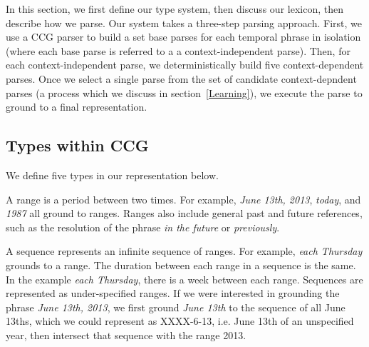 In this section, we first define our type system, then discuss our lexicon, then describe how we parse. Our system takes a three-step parsing approach. First, we use a CCG parser to build a set base parses for each temporal phrase in isolation (where each base parse is referred to a a context-independent parse). Then, for each context-independent parse, we deterministically build five context-dependent parses. Once we select a single parse from the set of candidate context-depndent parses (a process which we discuss in section~\ref{Learning}), we execute the parse to ground to a final representation.

\subsection{Types within CCG}
\label{sec:CCGtypes}
We define five types in our representation below.

\begin{definition}[Range]
A range is a period between two times. For example, \emph{June 13th, 2013}, \emph{today}, and \emph{1987} all ground to ranges. Ranges also include general past and future references, such as the resolution of the phrase \emph{in the future} or \emph{previously}.
\end{definition}

\begin{definition}[Sequence] 
A sequence represents an infinite sequence of ranges. For example, \emph{each Thursday} grounds to a range. The duration between each range in a sequence is the same. In the example \emph{each Thursday}, there is a week between each range. Sequences are represented as under-specified ranges. If we were interested in grounding the phrase \emph{June 13th, 2013}, we first ground \emph{June 13th} to the sequence of all June 13ths, which we could represent as XXXX-6-13, i.e. June 13th of an unspecified year, then intersect that sequence with the range 2013.
\end{definition}

